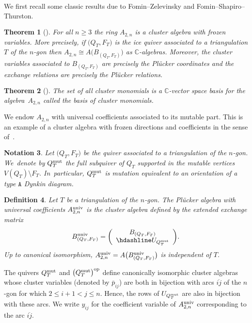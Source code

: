 \documentclass[10pt,a4paper]{amsart}
\newcommand{\thlabel}[1]{\label{#1}}
\newtheorem{Theorem}{Theorem}[section]
\newtheorem{Definition}[Theorem]{Definition}
\newtheorem{Notation}[Theorem]{Notation}
\numberwithin{equation}{section}
\begin{document}
We first recall some classic results due to Fomin--Zelevinsky and Fomin--Shapiro--Thurston.
\begin{Theorem}[\cite{FZ02}]
For all $n \geq 3$ the ring $A_{2,n}$ is a cluster algebra with frozen variables. More precisely, if $\big(Q_T,F_T\big)$ is the ice quiver associated to a triangulation $T$ of the $n$-gon then $A_{2,n}\cong A\big(B_{(Q_T,F_T)}\big)$ as $\mathbb C$-algebras. Moreover, the cluster variables associated to $B_{(Q_T,F_T)}$ are precisely the Pl\"ucker coordinates and the exchange relations are precisely the Pl\"ucker relations.
\end{Theorem}
\begin{Theorem}[\cite{FST08}]\thlabel{thm:cluster mono basis}
The set of all cluster monomials is a $\mathbb{C}$-vector space basis for the algebra~$A_{2,n}$ called the {\it basis of cluster monomials}.
\end{Theorem}


We endow $A_{2,n}$ with universal coefficients associated to its mutable part. This is an example of a cluster algebra with frozen directions and coefficients in the sense of~\cite{BFMN}.

\begin{Notation}
Let $\big(Q_T, F_T\big)$ be the quiver associated to a triangulation of the $n$-gon.
We~denote by $Q_T^{\rm{mut}}$ the full subquiver of $Q_T$ supported in the mutable vertices $V(Q_T)\setminus F_T$. In~particular, $Q_T^{\rm{mut}}$ is mutation equivalent to an orientation of a type $\mathtt A$ Dynkin diagram.
\end{Notation}

\begin{Definition}\thlabel{def:Plucker univ}
Let $T$ be a triangulation of the $n$-gon. The {\it Pl\"ucker algebra with universal coefficients} $A_{2,n}^{\rm{univ}}$ is the cluster algebra defined by the extended exchange matrix
\begin{displaymath}
B_{(Q_T,F_T)}^{\rm{univ}}=
\left(
\begin{array}{c}
 B_{(Q_T,F_T)} \\ \hdashline
 U_{Q^{\rm{mut}}_T}
\end{array}
\right)\!.
\end{displaymath}
Up to canonical isomorphism, $A_{2,n}^{\rm{univ}}=A\big(B_{(Q_T,F_T)}^{\rm{univ}}\big)$ is independent of $T$.
\end{Definition}

The quivers $Q_T^{\rm mut}$ and $\big(Q_T^{\rm mut}\big)^{\rm op}$ define canonically isomorphic cluster algebras whose cluster variables (denoted by $\bar p_{ij}$) are both in bijection with arcs $\overline{ij}$ of the $n$-gon for which $2\le i+1<j\le n$.
Hence, the rows of $U_{Q_T^{\rm mut}}$ are also in bijection with these arcs.
We write $y_{ij}$ for the coefficient variable of $A_{2,n}^{\rm univ}$ corresponding to the arc $\overline{ij}$.
\end{document}
